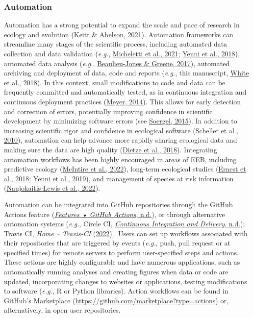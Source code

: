 \hypertarget{automation}{%
\subsubsection{Automation}\label{automation}}

Automation has a strong potential to expand the scale and pace of research in ecology and evolution (\protect\hyperlink{ref-cfgXxgt1}{Keitt \& Abelson, 2021}).
Automation frameworks can streamline many stages of the scientific process, including automated data collection and data validation (\emph{e.g.}, \protect\hyperlink{ref-bhDgD6lF}{Micheletti et al., 2021}; \protect\hyperlink{ref-lXvpQxeN}{Yenni et al., 2018}), automated data analysis (\emph{e.g.}, \protect\hyperlink{ref-Qh7xTLwz}{Beaulieu-Jones \& Greene, 2017}), automated archiving and deployment of data, code and reports (\emph{e.g.}, this manuscript, \protect\hyperlink{ref-SirQKFIz}{White et al., 2018}).
In this context, small modifications to code and data can be frequently committed and automatically tested, as in continuous integration and continuous deployment practices (\protect\hyperlink{ref-1Ep9EJL6y}{Meyer, 2014}).
This allows for early detection and correction of errors, potentially improving confidence in scientific development by minimizing software errors (see \protect\hyperlink{ref-ufw0ZdnI}{Soergel, 2015}).
In addition to increasing scientific rigor and confidence in ecological software (\protect\hyperlink{ref-12103x16N}{Scheller et al., 2010}), automation can help advance more rapidly sharing ecological data and making sure the data are high quality (\protect\hyperlink{ref-rTbinQMj}{Dietze et al., 2018}).
Integrating automation workflows has been highly encouraged in areas of EEB, including predictive ecology (\protect\hyperlink{ref-mmCOSRfr}{McIntire et al., 2022}), long-term ecological studies (\protect\hyperlink{ref-RxK4CmfR}{Ernest et al., 2018}; \protect\hyperlink{ref-1CJo8lo2v}{Yenni et al., 2019}), and management of species at risk information (\protect\hyperlink{ref-kZzfmBNu}{Naujokaitis-Lewis et al., 2022}).

Automation can be integrated into GitHub repositories through the GitHub Actions feature (\protect\hyperlink{ref-NUXbp429}{\emph{Features • GitHub Actions}, n.d.}), or through alternative automation systems (\emph{e.g.}, Circle CI, \protect\hyperlink{ref-T03Api6e}{\emph{Continuous Integration and Delivery}, n.d.}); Travis CI, \emph{Home -- Travis-CI} (\protect\hyperlink{ref-YeFSbfFV}{2022}){]}.
Users can set up workflows associated with their repositories that are triggered by events (\emph{e.g.}, push, pull request or at specified times) for remote servers to perform user-specified steps and actions.
These actions are highly configurable and have numerous applications, such as automatically running analyses and creating figures when data or code are updated, incorporating changes to websites or applications, testing modifications to software (\emph{e.g.}, R or Python libraries).
Action workflows can be found in GitHub's Marketplace (\url{https://github.com/marketplace?type=actions}) or, alternatively, in open user repositories.

